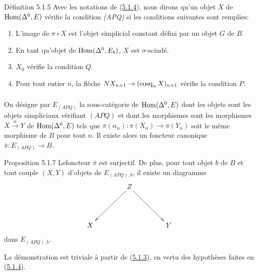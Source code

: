 \documentclass[10pt]{../fichiers-configuration-latex/smfart}
\begin{document}
\begin{enonce*}{Définition 5.1.5}
Avec les notations de (\hyperref[Vbis.subsubsec5.1.4]{5.1.4}), nous dirons qu'un
objet $X$ de
$\operatorname{Hom}(\Delta^{0}, E)$ vérifie la condition \emph{(APQ)} si les
conditions suivantes sont remplies:
\begin{enumerate}
\item[(i)] L'image de $\pi \circ X$ est l'objet simplicial constant défini
  par un objet $G$ de $B$.

\item[(ii)] En tant qu'objet de $\operatorname{Hom}(\Delta^0, E_b)$, $X$ est
  $\sigma$-scindé.

\item[(iii)] $X_0$ vérifie la condition $Q$.

\item[(iv)] Pour tout entier $n$, la flèche $N X_{n+1} \to (\cosq_n
  X)_{n+1}$ vérifie la condition $P$.
\end{enumerate}
\end{enonce*}

\setcounter{subsubsection}{5}
\subsubsection{}
On désigne par $E_{(APQ)}$ la sous-catégorie de $\operatorname{Hom}(\Delta^0, E)$
dont les objets sont les objets simpliciaux vérifiant $(APQ)$ et dont
les morphismes sont les morphismes $X \xrightarrow{\alpha} Y$ de
$\operatorname{Hom}(\Delta^{0}, E)$ tels que $\pi(\alpha_n) : \pi(X_n) \to
\pi(Y_n)$ soit le même morphisme de $B$ pour tout $n$. Il existe alors
un foncteur canonique $\bar{\pi} : E_{(APQ)} \to B$.

\begin{enonce*}{Proposition 5.1.7}
Le\pageoriginale foncteur $\bar{\pi}$ est surjectif. De plus, pour
tout objet $b$ de
$B$ et tout couple $(X, Y)$ d'objets de $E_{(APQ), b}$, il existe un
diagramme
\[
\xymatrix@=1.5cm{
  & Z \ar[ld]\ar[rd]&\\
X &   & Y
}
\]
dans $E_{(APQ), b}$.
\end{enonce*}

La démonstration est triviale à partir de (\hyperref[Vbis.prop5.1.3]{5.1.3}), en vertu des
hypothèses faites en (\hyperref[Vbis.subsubsec5.1.4]{5.1.4}).
\end{document}

